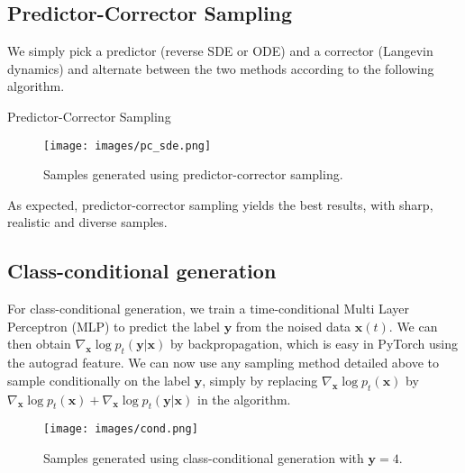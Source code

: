 \documentclass{article}
\begin{document}
\subsection{Predictor-Corrector Sampling}
We simply pick a predictor (reverse SDE or ODE) and a corrector (Langevin dynamics) and alternate between the two methods according to the following algorithm.
\begin{algorithm}[H]
	\caption{Predictor-Corrector Sampling}
	\label{alg:predictor-corrector}
	\begin{algorithmic}[1]
        \EndFor
        \item[]
	\end{algorithmic}
\end{algorithm}

\begin{figure}[H]
    \centering
    \texttt{[image: images/pc\_sde.png]}
    \caption{Samples generated using predictor-corrector sampling.}
    \label{fig:pc}
\end{figure}

As expected, predictor-corrector sampling yields the best results, with sharp, realistic and diverse samples.

\subsection{Class-conditional generation}
For class-conditional generation, we train a time-conditional Multi Layer Perceptron (MLP) to predict the label $\mathbf{y}$ from the noised data $\mathbf{x}(t)$.
We can then obtain $\nabla_\mathbf{x}\log p_t(\mathbf{y}|\mathbf{x})$ by backpropagation, which is easy in PyTorch using the autograd feature.
We can now use any sampling method detailed above to sample conditionally on the label $\mathbf{y}$, simply by replacing $\nabla_\mathbf{x}\log p_t(\mathbf{x})$ by $\nabla_\mathbf{x}\log p_t(\mathbf{x}) + \nabla_\mathbf{x}\log p_t(\mathbf{y}|\mathbf{x})$ in the algorithm.

\begin{figure}[H]
    \centering
    \texttt{[image: images/cond.png]}
    \caption{Samples generated using class-conditional generation with $\mathbf{y}=4$.}
    \label{fig:cond}
\end{figure}
\end{document}
